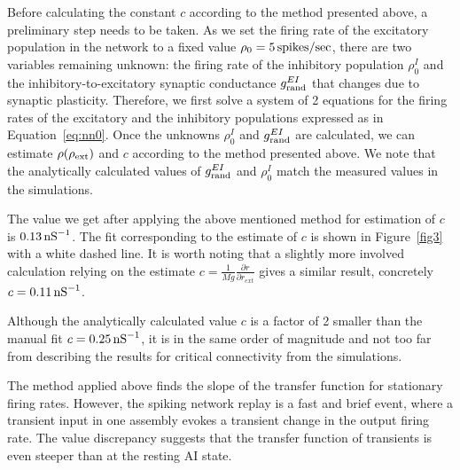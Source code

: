     Before calculating the constant $c$ according to the method presented
    above, a preliminary step needs to be taken. As we set the firing rate of
    the excitatory population in the network to a fixed value $\rho_0 = 5\,
    {\rm spikes/sec}$, there are two variables remaining unknown: the firing
    rate of the inhibitory population $\rho_0^I$ and the
    inhibitory-to-excitatory synaptic conductance $g_{\rm rand}^{EI}$ that
    changes due to synaptic plasticity. Therefore, we first solve a system of 2
    equations for the firing rates of the excitatory and the inhibitory
    populations expressed as in Equation~\ref{eq:nn0}. Once the unknowns $\rho_0^I$
    and $g_{\rm rand}^{EI}$ are calculated, we can estimate $\rho(\rho_{\rm
    ext})$ and $c$ according to the method presented above. We note that the
    analytically calculated values of $g_{\rm rand}^{EI}$ and $\rho_0^I$ match
    the measured values in the simulations.

    The value we get after applying the above mentioned method for estimation
    of $c$ is $0.13\,{\rm nS}^{-1}$. The fit corresponding to the
    estimate of $c$ is shown in Figure~\ref{fig3} with a white dashed line. It is
    worth noting that a slightly more involved calculation relying on the
    estimate $c=\frac{1}{Mg} \frac{\partial r}{\partial r_{ext}}$ gives a
    similar result, concretely $c = 0.11\,{\rm nS}^{-1}$.

    Although the analytically calculated value $c$ is a factor of 2 smaller
    than the manual fit $c=0.25\,{\rm nS}^{-1}$, it is in the same order of
    magnitude and not too far from describing the results for critical
    connectivity from the simulations.

    The method applied above finds the slope of the transfer function for
    stationary firing rates.  However, the spiking network replay is a fast and
    brief event, where a transient input in one assembly evokes a transient
    change in the output firing rate.  The value discrepancy suggests that the
    transfer function of transients is even steeper than at the resting AI
    state.

